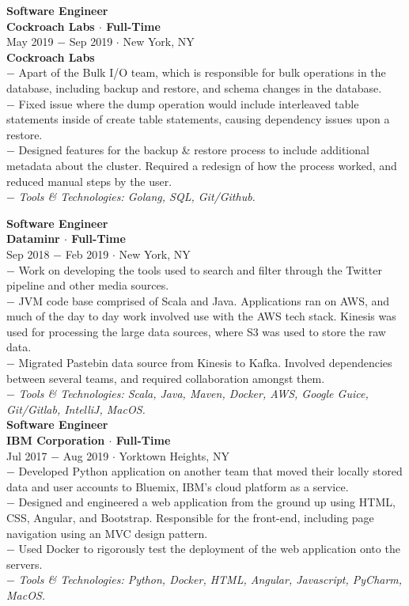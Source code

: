 \documentclass{resume}
\begin{document}
\begin{flushleft}
\newpage
\normalsize{\bf Software Engineer}\\
\footnotesize{\bf Cockroach Labs $\cdot$ Full-Time}\\
\footnotesize{May 2019  $-$ Sep 2019 $\cdot$ New York, NY}\\[1mm]
\textbf{Cockroach Labs}\\
{\scriptsize
	$-$ Apart of the Bulk I/O team, which is responsible for bulk operations in the database, including backup and restore, and schema changes in the database. \\
	$-$ Fixed issue where the dump operation would include interleaved table statements inside of create table statements, causing dependency issues upon a restore. \\
	$-$ Designed features for the backup \& restore process to include additional metadata about the cluster. Required a redesign of how the process worked, and reduced manual steps by the user. \\
	$-$ \textit{Tools \& Technologies: Golang, SQL, Git/Github.}\\[3mm]
}

\normalsize{\bf Software Engineer}\\
\footnotesize{\bf Dataminr $\cdot$ Full-Time}\\
\footnotesize{Sep 2018  $-$ Feb 2019 $\cdot$ New York, NY}\\[1mm]
{\scriptsize
$-$ Work on developing the tools used to search and filter through the Twitter pipeline and other media sources. \\
$-$ JVM code base comprised of Scala and Java. Applications ran on AWS, and much of the day to day work involved use with the AWS tech stack. Kinesis was used for processing the large data sources, where S3 was used to store the raw data.\\
$-$ Migrated Pastebin data source from Kinesis to Kafka. Involved dependencies between several teams, and required collaboration amongst them. \\
$-$ \textit{Tools \& Technologies: Scala, Java, Maven, Docker, AWS, Google Guice, Git/Gitlab, IntelliJ, MacOS.}\\[3mm]
}
\normalsize{\bf Software Engineer}\\
\footnotesize{\bf IBM Corporation $\cdot$ Full-Time}\\
\footnotesize{Jul 2017  $-$ Aug 2019 $\cdot$ Yorktown Heights, NY}\\[1mm]
{\scriptsize
	$-$ Developed Python application on another team that moved their locally stored data and user accounts to Bluemix, IBM's cloud platform as a service. \\
	$-$ Designed and engineered a web application from the ground up using HTML, CSS, Angular, and Bootstrap. Responsible for the front-end, including page navigation using an MVC design pattern. \\
	$-$ Used Docker to rigorously test the deployment of the web application onto the servers. \\
	$-$ \textit{Tools \& Technologies: Python, Docker, HTML, Angular, Javascript, PyCharm, MacOS.}\\[4mm]
}


\end{flushleft}
\end{document}
